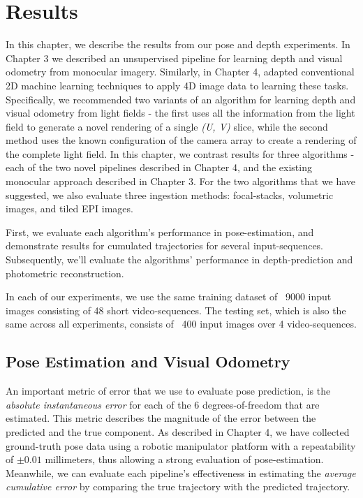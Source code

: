 

\chapter{Results}

In this chapter, we describe the results from our pose and depth experiments. In Chapter 3 we described an unsupervised pipeline for learning depth and visual odometry from monocular imagery. Similarly, in Chapter 4, adapted conventional 2D machine learning techniques to apply 4D image data to learning these tasks. Specifically, we recommended two variants of an algorithm for learning depth and visual odometry from light fields - the first uses all the information from the light field to generate a novel rendering of a single \textit{(U, V)} slice, while the second method uses the known configuration of the camera array to create a rendering of the complete light field. In this chapter, we contrast results for three algorithms - each of the two novel pipelines described in Chapter 4, and the existing monocular approach described in Chapter 3. For the two algorithms that we have suggested, we also evaluate three ingestion methods: focal-stacks, volumetric images, and tiled EPI images. 

First, we evaluate each algorithm's performance in pose-estimation, and demonstrate results for cumulated trajectories for several input-sequences. Subsequently, we'll evaluate the algorithms' performance in depth-prediction and photometric reconstruction. 

In each of our experiments, we use the same training dataset of ~9000 input images consisting of 48 short video-sequences. The testing set, which is also the same across all experiments, consists of ~400 input images over 4 video-sequences. 

\section{Pose Estimation and Visual Odometry}

An important metric of error that we use to evaluate pose prediction, is the \textit{absolute instantaneous error} for each of the 6 degrees-of-freedom that are estimated. This metric describes the magnitude of the error between the predicted and the true component. As described in Chapter 4, we have collected ground-truth pose data using a robotic manipulator platform with a repeatability of $\pm 0.01$ millimeters, thus allowing a strong evaluation of pose-estimation. Meanwhile, we can evaluate each pipeline's effectiveness in estimating the \textit{average cumulative error} by comparing the true trajectory with the predicted trajectory. 


